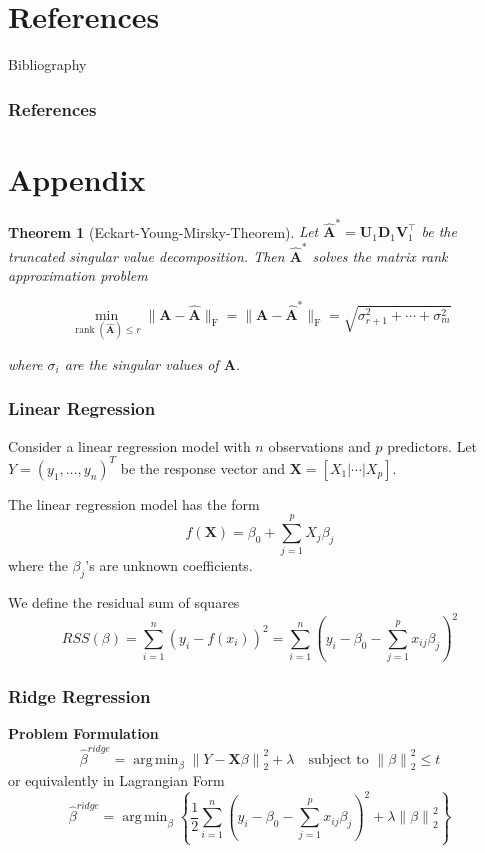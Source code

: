 \documentclass{beamer}
\theoremstyle{plain}
\newtheorem{thm}{Theorem}
\theoremstyle{definition}
\newcommand{\mat}[1]{\mathbf{#1}}
\DeclareMathOperator*{\argmin}{arg\,min}
\newcommand{\norm}[1]{\left\lVert #1 \right\rVert}
\begin{document}
\section{References}

\begin{frame}{Bibliography}
\frametitle{References}
\nocite{*}
\printbibliography
\end{frame}



\section{Appendix}

\begin{frame}
\begin{thm}[Eckart-Young-Mirsky-Theorem]
Let $\widehat{\mat{A}}^* = \mat{U}_1 \mat{D}_1 \mat{V}_1^{\top}$
be the \textit{truncated singular value decomposition}. Then $\widehat{ \mat{A}}^*$ solves the matrix rank approximation problem

$$\min_{\operatorname{rank}(\widehat{\mat{A}}) \leq r} \|\mat{A}-\widehat{\mat{A}}\|_{\text{F}} = \|\mat{A}-\widehat{\mat{A}}^*\|_{\text{F}} = \sqrt{\sigma^2_{r+1} + \cdots + \sigma^2_m}$$

where $\sigma_i$ are the singular values of $\mat A$.
\end{thm}
\end{frame}

\begin{frame}
\frametitle{Linear Regression}
Consider a linear regression model with $n$ observations and $p$ predictors. Let $Y = (y_1, \ldots , y_n)^T$ be the response vector and $\mat X = \left[X_1 \vert \cdots \vert X_p \right]$.\linebreak

The linear regression model has the form
$$f(\mat X) = \beta_0 + \sum_{j=1}^p X_j\beta_j$$
where the $\beta_j$'s are unknown coefficients.

We define the residual sum of squares
$$RSS(\beta) = \sum_{i=1}^n (y_i - f(x_i))^2 = \sum_{i=1}^n (y_i - \beta_0 - \sum_{j=1}^p x_{ij}\beta_j)^2$$
\end{frame}

\begin{frame}
\frametitle{Ridge Regression}
\textbf{Problem Formulation}
$$\hat{\beta}^{ridge} = \argmin_{\beta} \norm{Y - \mat{X}\beta}_{2}^{2} + \lambda \quad \text{subject to } \norm{\beta}_{2}^2 \leq t$$
or equivalently in Lagrangian Form
$$\hat{\beta}^{ridge} = \argmin_{\beta}\left\{\frac{1}{2}\sum_{i=1}^n (y_i - \beta_0 - \sum_{j=1}^p x_{ij}\beta_j)^2 + \lambda\norm{\beta}_{2}^2 \right\}$$
\end{frame}
\end{document}

